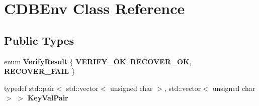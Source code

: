 \hypertarget{class_c_d_b_env}{}\section{C\+D\+B\+Env Class Reference}
\label{class_c_d_b_env}
\subsection*{Public Types}
\begin{DoxyCompactItemize}
\item 
\mbox{\label{class_c_d_b_env_a6fbf26da5d7f8f64a77a3ba15e4df244}} 
enum {\bfseries Verify\+Result} \{ {\bfseries V\+E\+R\+I\+F\+Y\+\_\+\+OK}, 
{\bfseries R\+E\+C\+O\+V\+E\+R\+\_\+\+OK}, 
{\bfseries R\+E\+C\+O\+V\+E\+R\+\_\+\+F\+A\+IL}
 \}
\item 
\mbox{\label{class_c_d_b_env_a53fd285f09c312973caa6f90b33937f5}} 
typedef std\+::pair$<$ std\+::vector$<$ unsigned char $>$, std\+::vector$<$ unsigned char $>$ $>$ {\bfseries Key\+Val\+Pair}
\end{DoxyCompactItemize}

